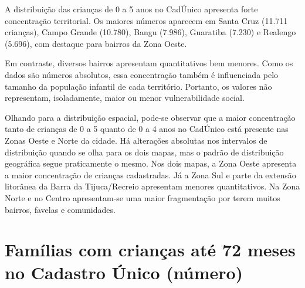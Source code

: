 
A distribuição das crianças de 0 a 5 anos no CadÚnico apresenta forte concentração territorial. Os maiores números aparecem em Santa Cruz (11.711 crianças), Campo Grande (10.780), Bangu (7.986), Guaratiba (7.230) e Realengo (5.696), com destaque para bairros da Zona Oeste.

Em contraste, diversos bairros apresentam quantitativos bem menores. Como os dados são números absolutos, essa concentração também é influenciada pelo tamanho da população infantil de cada território. Portanto, os valores não representam, isoladamente, maior ou menor vulnerabilidade social.


Olhando para a distribuição espacial, pode-se observar que a maior concentração tanto de crianças de 0 a 5 quanto de 0 a 4 anos no CadÚnico está presente nas Zonas Oeste e Norte da cidade. Há alterações absolutas nos intervalos de distribuição quando se olha para os dois mapas, mas o padrão de distribuição geográfica segue praticamente o mesmo. Nos dois mapas, a Zona Oeste apresenta a maior concentração de crianças cadastradas. Já a Zona Sul e parte da extensão litorânea da Barra da Tijuca/Recreio apresentam menores quantitativos. Na Zona Norte e no Centro apresentam-se uma maior fragmentação por terem muitos bairros, favelas e comunidades.


\section{Famílias com crianças até 72 meses no Cadastro Único (número)}

